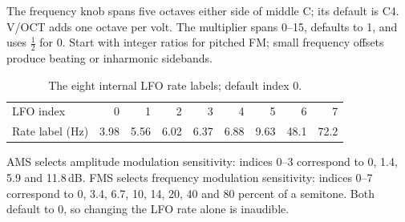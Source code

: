 The frequency knob spans five octaves either side of middle C; its default
is C4. V/OCT adds one octave per volt. The multiplier spans 0--15, defaults
to 1, and uses $\tfrac12$ for 0. Start with integer ratios for pitched FM;
small frequency offsets produce beating or inharmonic sidebands.

\begin{table}[ht]
\centering\small
\begin{tabular}{@{}lrrrrrrrr@{}}
\toprule LFO index & 0 & 1 & 2 & 3 & 4 & 5 & 6 & 7 \\
Rate label (Hz) & 3.98 & 5.56 & 6.02 & 6.37 & 6.88 & 9.63 & 48.1 & 72.2 \\
\bottomrule
\end{tabular}
\caption{The eight internal LFO rate labels; default index 0.}
\label{tab:lfo-frequencies}
\end{table}

AMS selects amplitude modulation sensitivity: indices 0--3 correspond to
0, 1.4, 5.9 and 11.8\,dB. FMS selects frequency modulation sensitivity:
indices 0--7 correspond to 0, 3.4, 6.7, 10, 14, 20, 40 and 80 percent of a
semitone. Both default to 0, so changing the LFO rate alone is inaudible.
